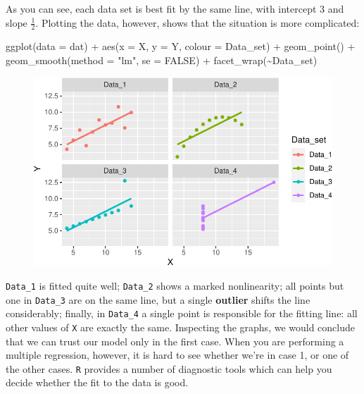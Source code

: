 \documentclass[
  letterpaper,
  DIV=11,
  numbers=noendperiod]{scrreprt}
\newenvironment{Shaded}{\begin{snugshade}}{\end{snugshade}}
\newcommand{\AttributeTok}[1]{\textcolor[rgb]{0.40,0.45,0.13}{#1}}
\newcommand{\ConstantTok}[1]{\textcolor[rgb]{0.56,0.35,0.01}{#1}}
\newcommand{\FunctionTok}[1]{\textcolor[rgb]{0.28,0.35,0.67}{#1}}
\newcommand{\NormalTok}[1]{\textcolor[rgb]{0.00,0.23,0.31}{#1}}
\newcommand{\SpecialCharTok}[1]{\textcolor[rgb]{0.37,0.37,0.37}{#1}}
\newcommand{\StringTok}[1]{\textcolor[rgb]{0.13,0.47,0.30}{#1}}
\begin{document}
As you can see, each data set is best fit by the same line, with
intercept 3 and slope \(\frac{1}{2}\). Plotting the data, however, shows
that the situation is more complicated:

\begin{Shaded}
\begin{Highlighting}[]
\FunctionTok{ggplot}\NormalTok{(}\AttributeTok{data =}\NormalTok{ dat) }\SpecialCharTok{+} \FunctionTok{aes}\NormalTok{(}\AttributeTok{x =}\NormalTok{ X, }\AttributeTok{y =}\NormalTok{ Y, }\AttributeTok{colour =}\NormalTok{ Data\_set) }\SpecialCharTok{+} 
  \FunctionTok{geom\_point}\NormalTok{() }\SpecialCharTok{+} \FunctionTok{geom\_smooth}\NormalTok{(}\AttributeTok{method =} \StringTok{"lm"}\NormalTok{, }\AttributeTok{se =} \ConstantTok{FALSE}\NormalTok{) }\SpecialCharTok{+} 
  \FunctionTok{facet\_wrap}\NormalTok{(}\SpecialCharTok{\textasciitilde{}}\NormalTok{Data\_set)}
\end{Highlighting}
\end{Shaded}

\begin{figure}[H]

{\centering \includegraphics{./08-linearreg_files/figure-pdf/unnamed-chunk-24-1.pdf}

}

\end{figure}

\texttt{Data\_1} is fitted quite well; \texttt{Data\_2} shows a marked
nonlinearity; all points but one in \texttt{Data\_3} are on the same
line, but a single \textbf{outlier} shifts the line considerably;
finally, in \texttt{Data\_4} a single point is responsible for the
fitting line: all other values of \texttt{X} are exactly the same.
Inspecting the graphs, we would conclude that we can trust our model
only in the first case. When you are performing a multiple regression,
however, it is hard to see whether we're in case 1, or one of the other
cases. \texttt{R} provides a number of diagnostic tools which can help
you decide whether the fit to the data is good.
\end{document}
